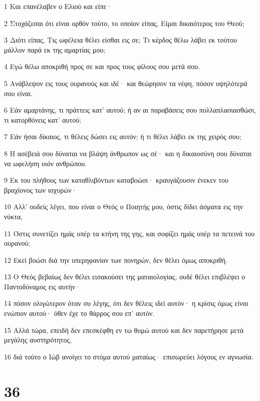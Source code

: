\par 1 Και επανέλαβεν ο Ελιού και είπε·
\par 2 Στοχάζεσαι ότι είναι ορθόν τούτο, το οποίον είπας, Είμαι δικαιότερος του Θεού;
\par 3 Διότι είπας, Τις ωφέλεια θέλει είσθαι εις σε; Τι κέρδος θέλω λάβει εκ τούτου μάλλον παρά εκ της αμαρτίας μου;
\par 4 Εγώ θέλω αποκριθή προς σε και προς τους φίλους σου μετά σου.
\par 5 Ανάβλεψον εις τους ουρανούς και ιδέ· και θεώρησον τα νέφη, πόσον υψηλότερά σου είναι.
\par 6 Εάν αμαρτάνης, τι πράττεις κατ' αυτού; ή αν αι παραβάσεις σου πολλαπλασιασθώσι, τι κατορθόνεις κατ' αυτού;
\par 7 Εάν ήσαι δίκαιος, τι θέλεις δώσει εις αυτόν; ή τι θέλει λάβει εκ της χειρός σου;
\par 8 Η ασέβειά σου δύναται να βλάψη άνθρωπον ως σέ· και η δικαιοσύνη σου δύναται να ωφελήση υιόν ανθρώπου.
\par 9 Εκ του πλήθους των καταθλιβόντων καταβοώσι· κραυγάζουσιν ένεκεν του βραχίονος των ισχυρών·
\par 10 Αλλ' ουδείς λέγει, που είναι ο Θεός ο Ποιητής μου, όστις δίδει άσματα εις την νύκτα,
\par 11 Όστις συνετίζει ημάς υπέρ τα κτήνη της γης, και σοφίζει ημάς υπέρ τα πετεινά του ουρανού;
\par 12 Εκεί βοώσι διά την υπερηφανίαν των πονηρών, δεν θέλει όμως αποκριθή.
\par 13 Ο Θεός βεβαίως δεν θέλει εισακούσει της ματαιολογίας, ουδέ θέλει επιβλέψει ο Παντοδύναμος εις αυτήν·
\par 14 πόσον ολιγώτερον όταν συ λέγης, ότι δεν θέλεις ιδεί αυτόν· η κρίσις όμως είναι ενώπιον αυτού· όθεν έχε το θάρρος σου επ' αυτόν.
\par 15 Αλλά τώρα, επειδή δεν επεσκέφθη εν τω θυμώ αυτού και δεν παρετήρησε μετά μεγάλης αυστηρότητος,
\par 16 διά τούτο ο Ιώβ ανοίγει το στόμα αυτού ματαίως· επισωρεύει λόγους εν αγνωσία.

\chapter{36}


